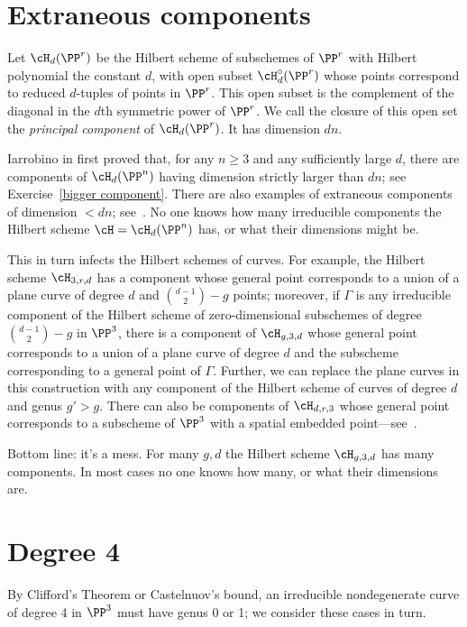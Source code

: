 \section{Extraneous components}

 Let $\cH_d(\PP^r)$ be the Hilbert scheme of subschemes of $\PP^r$ with Hilbert polynomial the constant $d$, with open subset $\cH^\circ_d(\PP^r)$ whose points correspond to reduced $d$-tuples of points in $\PP^r$. This open subset is the complement of the diagonal in the $d$th symmetric power of $\PP^r$. We call the closure of this open set the \emph{principal component} of $\cH_d(\PP^r)$. It has dimension $dn$.

Iarrobino in \cite{Iarrobino1985} first proved that, for any $n \geq 3$ and any sufficiently large $d$, there are components of $\cH_d(\PP^n)$ having dimension strictly larger than $dn$; see Exercise~\ref{bigger component}. There are also examples of extraneous components
of dimension $<dn$; see~\cite{MR2579394}. No one knows how many irreducible components the Hilbert scheme $\cH = \cH_d(\PP^n)$ has, or what their dimensions might be.

This in turn infects the Hilbert schemes of curves. For example, the Hilbert scheme $\cH_{3,r,d}$ has a component whose general point corresponds to a union of a plane curve of degree $d$ and $\binom{d-1}{2} - g$ points; moreover, if $\Gamma$ is any irreducible component of the Hilbert scheme of zero-dimensional subschemes of degree $\binom{d-1}{2} - g$ in $\PP^3$, there is a component of $\cH_{g,3,d}$ whose  general point corresponds to a union of a plane curve of degree $d$ and the subscheme corresponding to a general point of $\Gamma$. Further, we can replace the plane curves in this construction with any component of the Hilbert scheme of curves of degree $d$ and genus $g' > g$. There can also be components of $\cH_{d,r,3}$ whose general point corresponds to a subscheme of $\PP^3$ with a spatial embedded point---see~\cite{Chen-Nollet}.

Bottom line: it's a mess. For many $g,d$ the Hilbert scheme $\cH_{g,3,d}$ has many components. In most cases no one knows how many, or what their dimensions are. 

\section{Degree 4}

By Clifford's Theorem or Castelnuov's bound, an irreducible nondegenerate curve of degree 4 in $\PP^{3}$ must have genus 0 or 1; we consider these cases in turn.


